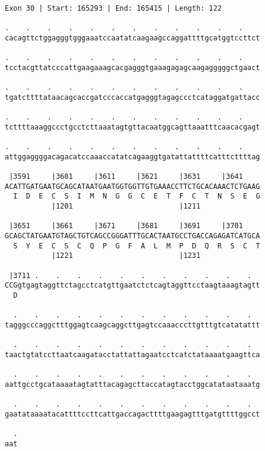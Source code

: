 \documentclass{article}
\begin{document}
\begin{Verbatim}
Exon 30 | Start: 165293 | End: 165415 | Length: 122
 
.    .    .    .    .    .    .    .    .    .    .    .    
cacagttctggagggtgggaaatccaatatcaagaagccaggattttgcatggtccttct
  
.    .    .    .    .    .    .    .    .    .    .    .    
tcctacgttatcccattgaagaaagcacgagggtgaaagagagcaagagggggctgaact
  
.    .    .    .    .    .    .    .    .    .    .    .    
tgatcttttataacagcaccgatcccaccatgagggtagagccctcataggatgattacc
  
.    .    .    .    .    .    .    .    .    .    .    .    
tcttttaaaggccctgcctcttaaatagtgttacaatggcagttaaatttcaacacgagt
  
.    .    .    .    .    .    .    .    .    .    .    .    
attggaggggacagacatccaaaccatatcagaaggtgatattattttcatttcttttag
  
 |3591     |3601     |3611     |3621     |3631     |3641    
ACATTGATGAATGCAGCATAATGAATGGTGGTTGTGAAACCTTCTGCACAAACTCTGAAG
  I  D  E  C  S  I  M  N  G  G  C  E  T  F  C  T  N  S  E  G
           |1201                         |1211              
  
 |3651     |3661     |3671     |3681     |3691     |3701    
GCAGCTATGAATGTAGCTGTCAGCCGGGATTTGCACTAATGCCTGACCAGAGATCATGCA
  S  Y  E  C  S  C  Q  P  G  F  A  L  M  P  D  Q  R  S  C  T
           |1221                         |1231              
  
 |3711 .    .    .    .    .    .    .    .    .    .    .  
CCGgtgagtaggttctagcctcatgttgaatctctcagtaggttcctaagtaaagtagtt
  D                                                         
  
  .    .    .    .    .    .    .    .    .    .    .    .  
tagggcccaggctttggagtcaagcaggcttgagtccaaacccttgtttgtcatatattt
  
  .    .    .    .    .    .    .    .    .    .    .    .  
taactgtatccttaatcaagatacctattattagaatcctcatctataaaatgaagttca
  
  .    .    .    .    .    .    .    .    .    .    .    .  
aattgcctgcataaaatagtatttacagagcttaccatagtacctggcatataataaatg
  
  .    .    .    .    .    .    .    .    .    .    .    .  
gaatataaaatacattttccttcattgaccagacttttgaagagtttgatgttttggcct
  
  .
aat
\end{Verbatim}
\newpage
\end{document}
